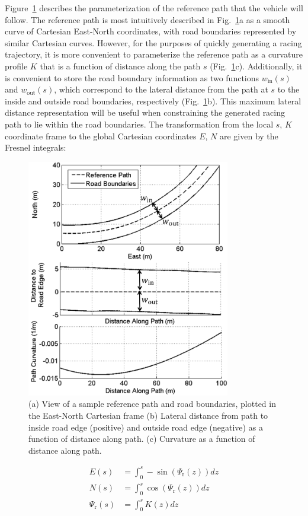 \documentclass[twocolumn,10pt, final]{asme2e}
\begin{document}
Figure~\ref{fig:worldInfo} describes the parameterization of the reference path that the vehicle will follow. The reference path is most intuitively described in Fig.~\ref{fig:worldInfo}a as a 
smooth curve of Cartesian East-North coordinates, with road boundaries represented by similar Cartesian curves. However, for the purposes of quickly generating
a racing trajectory, it is more convenient to parameterize the reference path as a curvature profile $K$ that is a function of distance along the path $s$ (Fig.~\ref{fig:worldInfo}c). Additionally, it is 
convenient to store the road boundary information as two functions $w_\mathrm{in}(s)$ and $w_\mathrm{out}(s)$, which correspond to the lateral distance from the path at $s$
 to the inside and outside road boundaries, respectively (Fig.~\ref{fig:worldInfo}b). This maximum lateral distance representation will be useful when constraining the generated racing path to lie within the road 
 boundaries. The transformation from the local $s$, $K$ coordinate frame to 
the global Cartesian coordinates $E$, $N$ are given by the Fresnel integrals:
\begin{figure}
\centering
\includegraphics[width=3.5in]{figures/worldInfo.png}
\caption{(a) View of a sample reference path and road boundaries, plotted in the East-North Cartesian frame (b) Lateral distance from path to inside road edge (positive) and outside road edge (negative) as a function
of distance along path. (c) Curvature as a function of distance along path.}
\label{fig:worldInfo}
\end{figure}
\begin{subequations}
\label{eq:fresnel}
\begin{align}
	E(s) &= \int_0^s  -\sin(\Psi_\mathrm{r}(z)) dz \\
	N(s) &= \int_0^s   \cos(\Psi_\mathrm{r}(z)) dz \\
	\Psi_\mathrm{r}(s) &= \int_0^s K(z) dz \label{eq:balls}
\end{align}
\end{subequations}
\end{document}
